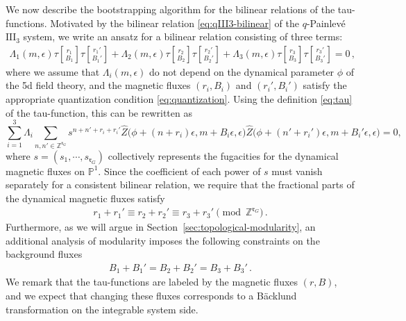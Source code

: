 \documentclass[11pt, a4paper]{article}
\newcommand{\tauftn}[2]{\tau\genfrac[]{0pt}{1}{#1}{#2}}
\theoremstyle{definition}
\begin{document}
We now describe the bootstrapping algorithm for the bilinear relations of the tau-functions. Motivated by the bilinear relation \eqref{eq:qIII3-bilinear} of the $ q $-Painlev\'e $ \mathrm{III}_3 $ system, we write an ansatz for a bilinear relation consisting of three terms:
\begin{align}\label{eq:ansatz}
    \Lambda_1(m,\epsilon) \tauftn{r_1}{B_1} \tauftn{r_1'}{B_1'} + \Lambda_2(m,\epsilon) \tauftn{r_2}{B_2} \tauftn{r_2'}{B_2'} + \Lambda_3(m,\epsilon) \tauftn{r_3}{B_3} \tauftn{r_3'}{B_3'} = 0 \, ,
\end{align}
where we assume that $ \Lambda_i(m,\epsilon) $ do not depend on the dynamical parameter $ \phi $ of the 5d field theory, and the magnetic fluxes $ (r_i, B_i) $ and $ (r_i',B_i') $ satisfy the appropriate quantization condition \eqref{eq:quantization}. Using the definition \eqref{eq:tau} of the tau-function, this can be rewritten as
\begin{equation}
    \sum_{i=1}^3 \Lambda_i \sum_{n,n' \in \mathbb{Z}^{\mathfrak{r}_G}} s^{n+n'+r_i+r_i'} \hat{Z}\big(\phi+(n+r_i)\epsilon, m+B_i\epsilon,\epsilon\big) \hat{Z}\big(\phi+(n'+r_i')\epsilon, m+B_i'\epsilon,\epsilon\big) = 0 ,
\end{equation}
where $ s=(s_1,\cdots,s_{\mathfrak{r}_G}) $ collectively represents the fugacities for the dynamical magnetic fluxes on $ \mathbb{P}^1 $. Since the coefficient of each power of $ s $ must vanish separately for a consistent bilinear relation, we require that the fractional parts of the dynamical magnetic fluxes satisfy
\begin{align}\label{eq:total-flux-cond-r}
    r_1 + r_1' \equiv r_2+r_2' \equiv r_3+r_3' \pmod{\mathbb{Z}^{\mathfrak{r}_G}} \, .
\end{align}
Furthermore, as we will argue in Section~\ref{sec:topological-modularity}, an additional analysis of modularity imposes the following constraints on the background fluxes
\begin{align}\label{eq:total-flux-cond-B}
    B_1 + B_1' = B_2 + B_2' = B_3 + B_3' \, .
\end{align}
We remark that the tau-functions are labeled by the magnetic fluxes $ (r,B) $, and we expect that changing these fluxes corresponds to a B\"acklund transformation on the integrable system side.
\end{document}
